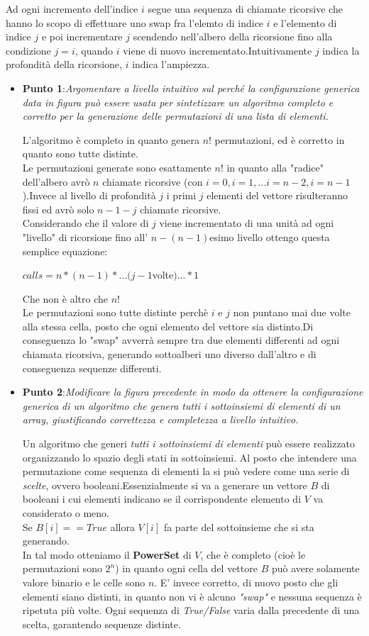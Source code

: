 \documentclass[a4paper]{article}
\begin{document}
Ad ogni incremento dell'indice $i$ segue una sequenza di chiamate ricorsive che hanno lo scopo di effettuare uno swap fra l'elemto di indice $i$ e l'elemento di indice $j$ e poi incrementare $j$ scendendo nell'albero della ricorsione fino alla condizione $j=i$, quando $i$ viene di nuovo incrementato.Intuitivamente $j$ indica la profondità della ricorsione, $i$ indica l'ampiezza.
\begin{itemize}
	\item \textbf{Punto 1}:\emph{Argomentare a livello intuitivo sul perché la configurazione generica data in figura può essere usata per sintetizzare un algoritmo completo e corretto per la generazione delle permutazioni di una lista di elementi.}


L'algoritmo è completo in quanto genera $n!$ permutazioni, ed è corretto in quanto sono tutte distinte.\\Le permutazioni generate sono esattamente $n!$ in quanto alla "radice" dell'albero avrò $n$ chiamate ricorsive (con $i = 0, i=1, ... i= n-2, i=n-1$ ).Invece al livello di profondità $j$ i primi $j$ elementi del vettore risulteranno fissi ed avrò solo $n-1-j$ chiamate ricorsive.\\Considerando che il valore di $j$ viene incrementato di una unità ad ogni "livello" di ricorsione fino all' $n-(n-1)$esimo livello ottengo questa semplice equazione: \begin{center}$calls = n * (n-1) * ...(j-1$volte$)... * 1$\end{center}Che non è altro che $n!$\\
		Le permutazioni sono tutte distinte perchè $i$ e $j$ non puntano mai due volte alla stessa cella, posto che ogni elemento del vettore sia distinto.Di conseguenza lo "swap" avverrà sempre tra due elementi differenti ad ogni chiamata ricorsiva, generando sottoalberi uno diverso dall'altro e di conseguenza sequenze differenti.
	\item \textbf{Punto 2}:\emph{Modificare la figura precedente in modo da ottenere la configurazione generica di un algoritmo che genera tutti i sottoinsiemi di elementi di un array, giustificando correttezza e completezza a livello intuitivo.}


		Un algoritmo che generi \textit{tutti i sottoinsiemi di elementi} può essere realizzato organizzando lo spazio degli stati in sottoinsiemi.
		Al posto che intendere una permutazione come sequenza di elementi la si può vedere come una serie di \textit{scelte}, ovvero booleani.Essenzialmente si va a generare un vettore $B$ di booleani i cui elementi indicano se il corrispondente elemento di $V$ va considerato o meno.\\
		Se $B[i] == True$ allora $V[i]$ fa parte del sottoinsieme che si sta generando.\\
		In tal modo otteniamo il \textbf{PowerSet} di $V$, che è completo (cioè le permutazioni sono $2^n$) in quanto ogni cella del vettore $B$ può avere solamente valore binario e le celle sono $n$.
		E' invece corretto, di nuovo posto che gli elementi siano distinti, in quanto non vi è alcuno \textit{"swap"} e nessuna sequenza è ripetuta più volte. Ogni sequenza di \textit{True/False} varia dalla precedente di una scelta, garantendo sequenze distinte.
\end{itemize}
\end{document}
